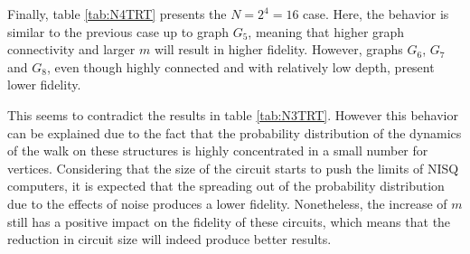 \documentclass[../../dissertation.tex]{subfiles}
\begin{document}
Finally, table \ref{tab:N4TRT} presents the $N = 2^4 = 16$ case. Here, the
behavior is similar to the previous case up to graph $G_5$, meaning that
higher graph connectivity and larger $m$ will result in higher fidelity.
However, graphs $G_6$, $G_7$ and $G_8$, even though highly connected and
with relatively low depth, present lower fidelity. 
\begin{table}[!h]
\centering
{}
\caption{Fidelity of quantum state with N=16, backend \textit{Toronto}, and t=1.}
\label{tab:N4TRT}
\end{table}
This seems to contradict the results in table \ref{tab:N3TRT}. However this
behavior can be explained due to the fact that the probability distribution of
the dynamics of the walk on these structures is highly concentrated in a small
number for vertices. Considering that the size of the circuit starts to push
the limits of NISQ computers, it is expected that the spreading out of the
probability distribution due to the effects of noise produces a lower
fidelity. Nonetheless, the increase of $m$ still has a positive impact on the
fidelity of these circuits, which means that the reduction in circuit size will
indeed produce better results.
\end{document}
